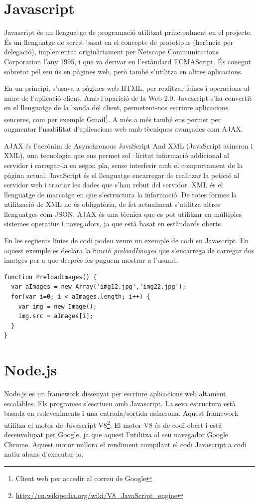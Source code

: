 \section{Javascript}

Javascript és un llenguatge de programació utilitzat principalment en el projecte. És un llenguatge de script basat en el concepte de prototipus (herència per delegació), implementat originàriament per Netscape Communications Corporation l'any 1995, i que va derivar en l'estàndard ECMAScript. És conegut sobretot pel seu ús en pàgines web, però també s'utilitza en altres aplicacions.

En un principi, s'usava a pàgines web HTML, per realitzar feines i operacions al marc de l'aplicació client. Amb l'aparició de la Web 2.0, Javascript s'ha convertit en el llenguatge de la banda del client, permetent-nos escriure aplicacions senceres, com per exemple Gmail\footnote{Client web per accedir al correu de Google}. A més a més també ens permet per augmentar l'usabilitat d'aplicacions web amb tècniques avançades com AJAX.

AJAX és l'acrònim de Asynchronous JavaScript And XML (JavaScript asíncron i XML), una tecnologia que ens permet sol·licitat informació addicional al servidor i carregar-la en segon pla, sense interferir amb el comportament de la pàgina actual. JavaScript és el llenguatge encarregar de realitzar la petició al servidor web i tractar les dades que s'han rebut del servidor. XML és el llenguatge de marcatge en que s'estructura la informació. De totes formes la utilització de XML no és obligatòria, de fet actualment s'utilitza altres llenguatges com JSON. AJAX és una tècnica que es pot utilitzar en múltiples sistemes operatius i navegadors, ja que està basat en estàndards oberts.

En les següents línies de codi podeu veure un exemple de codi en Javascript. En aquest exemple es declara la funció \emph{preloadImages} que s'encarrega de carregar dos imatges per a que desprès les puguem mostrar a l'usuari.
 
\begin{lstlisting}
function PreloadImages() {
  var aImages = new Array('img12.jpg','img22.jpg');
  for(var i=0; i < aImages.length; i++) {
    var img = new Image();
    img.src = aImages[i];
  }
}
\end{lstlisting}


\section{Node.js}
\label{sec:node.js-min}
Node.js es un framework dissenyat per escriure aplicacions web altament escalables. Els programes s'escriuen amb Javascript. La seva estructura està basada en esdeveniments i una entrada/sortida asíncrona. Aquest framework utilitza el motor de Javascript V8\footnote{\url{http://en.wikipedia.org/wiki/V8_JavaScript_engine}}. El motor V8 és de codi obert i està desenvolupat per Google, ja que aquest l'utilitza al seu navegador Google Chrome. Aquest motor millora el rendiment compilant el codi Javascript a codi natiu abans d'executar-lo.


